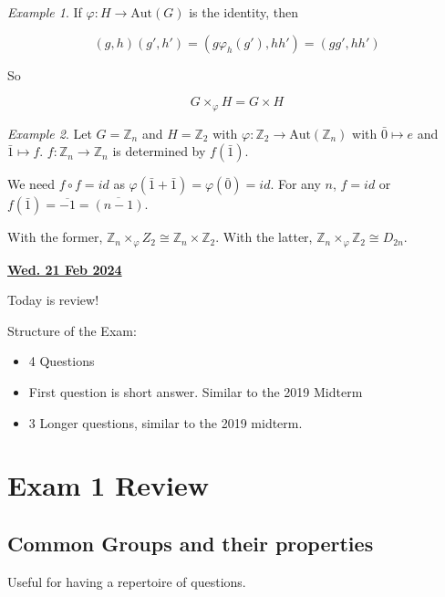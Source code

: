 \documentclass[12pt]{article}
\renewcommand{\date}[1]{\underline{\bf #1}}
\def\Aut{\text{Aut}}
\def\Z{{\mathbb Z}}
\theoremstyle{remark}
\theoremstyle{remark}
\theoremstyle{remark}
\newtheorem{example}{Example}
\theoremstyle{remark}
\theoremstyle{remark}
\begin{document}
\begin{example}
  If $\varphi: H \to \Aut(G)$ is the identity, then

  \[
    (g, h)(g', h') = (g \varphi_h(g'), hh') = (gg', hh')
  \]

  So

  \[
    G \times_\varphi H = G \times H
  \]
\end{example}

\begin{example}
  Let $G = \Z_n$ and $H = \Z_2$ with $\varphi: \Z_2 \to \Aut(\Z_n)$ with $\bar 0
  \mapsto e$ and $\bar 1 \mapsto f$. $f: \Z_n \to \Z_n$ is determined by $f(\bar
  1)$.

  We need $f \circ f = id$ as $\varphi(\bar 1 + \bar 1) = \varphi(\bar 0) = id$.
  For any $n$, $f = id$ or $f(\bar 1) = \overline{-1} = \overline{(n - 1)}$.

  With the former, $\Z_n \times_\varphi Z_2 \cong \Z_n \times \Z_2$. With the
  latter, $\Z_n \times_\varphi \Z_2 \cong D_{2n}$.
\end{example}

\date{Wed. 21 Feb 2024}

Today is review!

Structure of the Exam:
\begin{itemize}
  \item 4 Questions
  \item First question is short answer. Similar to the 2019 Midterm
  \item 3 Longer questions, similar to the 2019 midterm.
\end{itemize}

\section{Exam 1 Review}

\subsection{Common Groups and their properties}

Useful for having a repertoire of questions.
\end{document}

